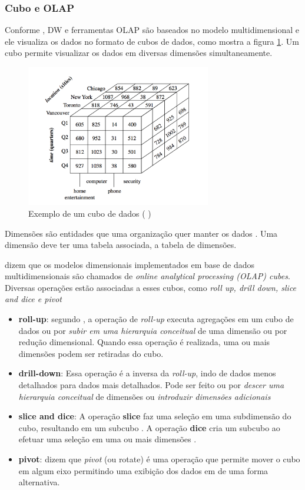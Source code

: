 \subsubsection{Cubo e OLAP}
Conforme , DW e ferramentas OLAP são baseados no modelo multidimensional e ele visualiza os dados no formato de cubos de dados, como mostra a figura \ref{cube}. Um cubo permite visualizar os dados em diversas dimensões simultaneamente.
\begin{figure}[ht]
\centering
\includegraphics[height=6.2cm]{imagens/datacube.png}
\caption{Exemplo de um cubo de dados (\citeauthor{jmj} \citeyear{jmj})}
\label{cube}
\end{figure}
Dimensões são entidades que uma organização quer manter os dados \citep{jmj}. Uma dimensão deve ter uma tabela associada, a tabela de dimensões.


 dizem que os modelos dimensionais implementados em base de dados multidimensionais são chamados de \textit{online analytical processing (OLAP) cubes}. Diversas operações estão associadas a esses cubos, como \textit{roll up, drill down, slice and dice e pivot}

\begin{itemize}
    \item \textbf{roll-up}: segundo , a operação de \textit{roll-up} executa agregações em um cubo de dados ou por \textit{subir em uma hierarquia conceitual} de uma dimensão ou por redução dimensional. Quando essa operação é realizada, uma ou mais dimensões podem ser retiradas do cubo.
    
    \item \textbf{drill-down}: Essa operação é a inversa da \textit{roll-up}, indo de dados menos detalhados para dados mais detalhados. Pode ser feito ou por \textit{descer uma hierarquia conceitual} de dimensões ou \textit{introduzir dimensões adicionais} \citep{jmj}
    
    \item \textbf{slice and dice}: A operação \textbf{slice} faz uma seleção em uma subdimensão do cubo, resultando em um subcubo \citep{jmj}. A operação \textbf{dice} cria um subcubo ao efetuar uma seleção em uma ou mais dimensões \citep{jmj}.
    
    \item \textbf{pivot}:  dizem que \textit{pivot} (ou rotate) é uma operação que permite mover o cubo em algum eixo permitindo uma exibição dos dados em de uma forma alternativa.
\end{itemize}
